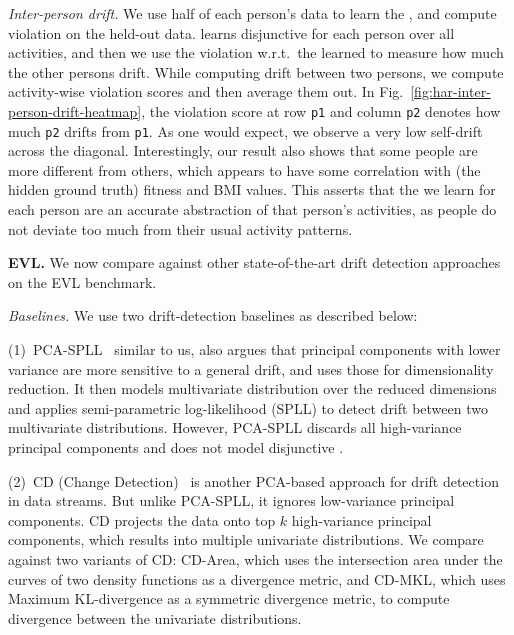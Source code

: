 \noindent {} \emph{Inter-person drift.}  We use half of each person's data to
learn the \invariants, and compute violation on the held-out data. \system
learns disjunctive \invariants for each person over all activities, and then we
use the violation w.r.t.\ the learned \invariants to measure how much the other
persons drift. While computing drift between two persons, we compute
activity-wise \invariant violation scores and then average them out. In
Fig.~\ref{fig:har-inter-person-drift-heatmap}, the violation score at row
\texttt{p1} and column \texttt{p2} denotes how much \texttt{p2} drifts from
\texttt{p1}. As one would expect, we observe a very low self-drift across the
diagonal. Interestingly, our result also shows that some people are more
different from others, which appears to have some correlation with (the hidden
ground truth) fitness and BMI values. This asserts that the \invariants we
learn for each person are an accurate abstraction of that person's activities,
as people do not deviate too much from their usual activity patterns.




\smallskip

\noindent \textbf{EVL.} We now compare \system against other state-of-the-art
drift detection approaches on the EVL benchmark.

\smallskip

\noindent\emph{Baselines.}
%
We use two drift-detection baselines as described below:

\smallskip

(1)~PCA-SPLL~\cite{DBLP:journals/tnn/KunchevaF14} 
similar to us, also argues that principal components with lower variance are
more sensitive to a general drift, and uses those for dimensionality reduction.
It then models multivariate distribution over the reduced dimensions and
applies semi-parametric log-likelihood (SPLL) to detect drift between two
multivariate distributions. However, PCA-SPLL discards all high-variance
principal components and does not model disjunctive \invariants.

\smallskip
 
(2)~CD (Change Detection)~\cite{DBLP:conf/kdd/QahtanAWZ15}
is another PCA-based approach for drift detection in data streams. But unlike
PCA-SPLL, it ignores low-variance principal components. CD projects the data
onto top $k$ high-variance principal components, which results into multiple
univariate distributions. We compare against two variants of CD: CD-Area, which
uses the intersection area under the curves of two density functions as a
divergence metric, and CD-MKL, which uses Maximum KL-divergence as a symmetric
divergence metric, to compute divergence between the univariate distributions.

